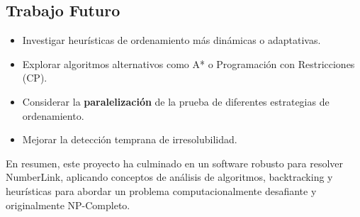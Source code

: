 \documentclass[spanish]{article}
\numberwithin{equation}{section}
\numberwithin{figure}{section}
\theoremstyle{definition}
\begin{document}
\subsection{Trabajo Futuro}
\begin{itemize}
    \item Investigar heurísticas de ordenamiento más dinámicas o adaptativas.
    \item Explorar algoritmos alternativos como A* o Programación con Restricciones (CP).
    \item Considerar la \textbf{paralelización} de la prueba de diferentes estrategias de ordenamiento.
    \item Mejorar la detección temprana de irresolubilidad.
\end{itemize}

En resumen, este proyecto ha culminado en un software robusto para resolver NumberLink, aplicando conceptos de análisis de algoritmos, backtracking y heurísticas para abordar un problema computacionalmente desafiante y originalmente NP-Completo.
\end{document}
